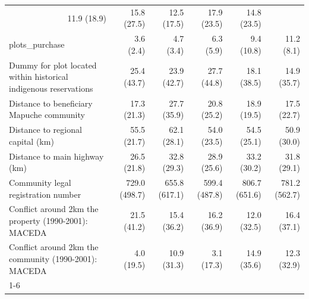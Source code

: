 \documentclass{article}
\begin{document}
\begin{table}[!h]
\begin{tabular}{llllll}
  \multicolumn{1}{r}{11.9 (18.9)} &
  \multicolumn{1}{r}{15.8 (27.5)} &
  \multicolumn{1}{r}{12.5 (17.5)} &
  \multicolumn{1}{r}{17.9 (23.5)} &
  \multicolumn{1}{r}{14.8 (23.5)} \\
\multicolumn{1}{l}{plots\_purchase} &
  \multicolumn{1}{r}{3.6 (2.4)} &
  \multicolumn{1}{r}{4.7 (3.4)} &
  \multicolumn{1}{r}{6.3 (5.9)} &
  \multicolumn{1}{r}{9.4 (10.8)} &
  \multicolumn{1}{r}{11.2 (8.1)} \\
\multicolumn{1}{l}{Dummy for plot located within historical indigenous reservations} &
  \multicolumn{1}{r}{25.4 (43.7)} &
  \multicolumn{1}{r}{23.9 (42.7)} &
  \multicolumn{1}{r}{27.7 (44.8)} &
  \multicolumn{1}{r}{18.1 (38.5)} &
  \multicolumn{1}{r}{14.9 (35.7)} \\
\multicolumn{1}{l}{Distance to beneficiary Mapuche community} &
  \multicolumn{1}{r}{17.3 (21.3)} &
  \multicolumn{1}{r}{27.7 (35.9)} &
  \multicolumn{1}{r}{20.8 (25.2)} &
  \multicolumn{1}{r}{18.9 (19.5)} &
  \multicolumn{1}{r}{17.5 (22.7)} \\
\multicolumn{1}{l}{Distance to regional capital (km)} &
  \multicolumn{1}{r}{55.5 (21.7)} &
  \multicolumn{1}{r}{62.1 (28.1)} &
  \multicolumn{1}{r}{54.0 (23.5)} &
  \multicolumn{1}{r}{54.5 (25.1)} &
  \multicolumn{1}{r}{50.9 (30.0)} \\
\multicolumn{1}{l}{Distance to main highway (km)} &
  \multicolumn{1}{r}{26.5 (21.8)} &
  \multicolumn{1}{r}{32.8 (29.3)} &
  \multicolumn{1}{r}{28.9 (25.6)} &
  \multicolumn{1}{r}{33.2 (30.2)} &
  \multicolumn{1}{r}{31.8 (29.1)} \\
\multicolumn{1}{l}{Community legal registration number} &
  \multicolumn{1}{r}{729.0 (498.7)} &
  \multicolumn{1}{r}{655.8 (617.1)} &
  \multicolumn{1}{r}{599.4 (487.8)} &
  \multicolumn{1}{r}{806.7 (651.6)} &
  \multicolumn{1}{r}{781.2 (562.7)} \\
\multicolumn{1}{l}{Conflict around 2km the property (1990-2001): MACEDA} &
  \multicolumn{1}{r}{21.5 (41.2)} &
  \multicolumn{1}{r}{15.4 (36.2)} &
  \multicolumn{1}{r}{16.2 (36.9)} &
  \multicolumn{1}{r}{12.0 (32.5)} &
  \multicolumn{1}{r}{16.4 (37.1)} \\
\multicolumn{1}{l}{Conflict around 2km the community (1990-2001): MACEDA} &
  \multicolumn{1}{r}{4.0 (19.5)} &
  \multicolumn{1}{r}{10.9 (31.3)} &
  \multicolumn{1}{r}{3.1 (17.3)} &
  \multicolumn{1}{r}{14.9 (35.6)} &
  \multicolumn{1}{r}{12.3 (32.9)} \\
\cline{1-6}
\end{tabular}
\end{table}
\end{document}
